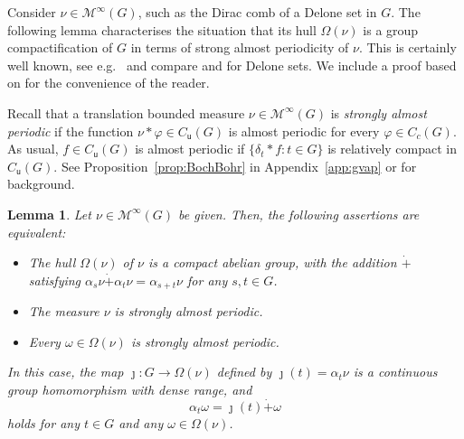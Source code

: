 \documentclass[11pt, a4wide]{amsart}
\newcommand{\MTB}{\mathcal{M}^{\infty}(G)}
\newtheorem{lemma}{Lemma}
\numberwithin{lemma}{section}
\begin{document}
\smallskip

Consider $\nu\in \mathcal M^\infty(G)$, such as the Dirac comb of a Delone set in $G$. The following lemma characterises the situation that its hull $\Omega(\nu)$ is a group compactification of $G$ in terms of strong almost periodicity of $\nu$. This is certainly well known, see e.g.~\cite[Prop.~3.6]{LenStr16} and compare  \cite[Thm.~3.3]{KL13} and \cite[Thm.~4.2]{KL13} for Delone sets. We include a proof based on \cite{LR} for the convenience of the reader.

\smallskip

Recall that a translation bounded measure $\nu\in\mathcal{M}^\infty(G)$ is \textit{strongly almost periodic} if the function $\nu \ast \varphi\in C_\mathsf{u}(G)$ is almost periodic for every $\varphi \in C_c (G)$. As usual,  $f \in C_\mathsf{u}(G)$ is almost periodic if $\{\delta_t \ast f : t\in G\}$ is relatively compact  in $C_\mathsf{u} (G)$. See Proposition~\ref{prop:BochBohr} in Appendix~\ref{app:gvap} or \cite{C68,K04}  for background.


\begin{lemma}\label{lem:sap}
Let $\nu \in \MTB$ be given. Then, the following assertions are equivalent:
%
\begin{itemize}
\item[(i)] The hull $\Omega(\nu)$ of $\nu$ is a compact abelian group, with the addition $\dot{+}$ satisfying $\alpha_s \nu \dot{+} \alpha_t \nu = \alpha_{s+t} \nu$ for any $s, t \in G$.
\item[(ii)] The measure $\nu$ is strongly almost periodic.
\item[(iii)] Every $\omega\in\Omega(\nu)$ is strongly almost periodic.
\end{itemize}
%
In this case, the map  $\jmath: G \to \Omega(\nu)$ defined by $\jmath(t) = \alpha_{t} \nu$ is a continuous group homomorphism with dense range, and
$$\alpha_{t} \omega = \jmath(t) \dot{+} \omega$$
holds for any $t\in G$ and any $\omega \in \Omega(\nu)$.
\end{lemma}
\end{document}
